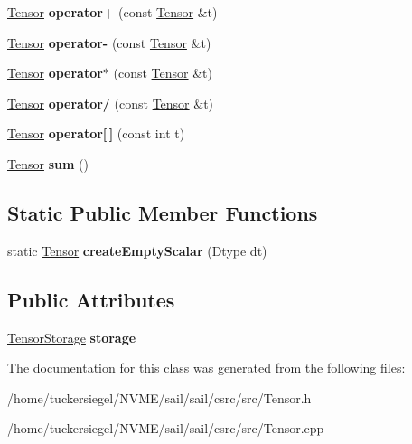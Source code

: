 \begin{DoxyCompactItemize}
\item 
\mbox{\label{classsail_1_1Tensor_af3f9e9beaa195d6a48cd523d531d8ce4}} 
\hyperlink{classsail_1_1Tensor}{Tensor} {\bfseries operator+} (const \hyperlink{classsail_1_1Tensor}{Tensor} \&t)
\item 
\mbox{\label{classsail_1_1Tensor_af832582e453597ae2d363d0936abc77a}} 
\hyperlink{classsail_1_1Tensor}{Tensor} {\bfseries operator-\/} (const \hyperlink{classsail_1_1Tensor}{Tensor} \&t)
\item 
\mbox{\label{classsail_1_1Tensor_afaa6db9a39f505b4f796349fcc17a19e}} 
\hyperlink{classsail_1_1Tensor}{Tensor} {\bfseries operator$\ast$} (const \hyperlink{classsail_1_1Tensor}{Tensor} \&t)
\item 
\mbox{\label{classsail_1_1Tensor_a937b0da33dfb53b1c111a773c0b9ef88}} 
\hyperlink{classsail_1_1Tensor}{Tensor} {\bfseries operator/} (const \hyperlink{classsail_1_1Tensor}{Tensor} \&t)
\item 
\mbox{\label{classsail_1_1Tensor_ae9bbb41d1a9f6c1c0a2241301059effd}} 
\hyperlink{classsail_1_1Tensor}{Tensor} {\bfseries operator\mbox{[}$\,$\mbox{]}} (const int t)
\item 
\mbox{\label{classsail_1_1Tensor_a237adf4c39950d5a56b3a7b608cadfb6}} 
\hyperlink{classsail_1_1Tensor}{Tensor} {\bfseries sum} ()
\end{DoxyCompactItemize}
\subsection*{Static Public Member Functions}
\begin{DoxyCompactItemize}
\item 
\mbox{\label{classsail_1_1Tensor_a9a798c58a36c12db832739235f330b9d}} 
static \hyperlink{classsail_1_1Tensor}{Tensor} {\bfseries create\+Empty\+Scalar} (Dtype dt)
\end{DoxyCompactItemize}
\subsection*{Public Attributes}
\begin{DoxyCompactItemize}
\item 
\mbox{\label{classsail_1_1Tensor_a998b6320f8aa40363d242b2bcd83be7b}} 
\hyperlink{classTensorStorage}{Tensor\+Storage} {\bfseries storage}
\end{DoxyCompactItemize}


The documentation for this class was generated from the following files\+:\begin{DoxyCompactItemize}
\item 
/home/tuckersiegel/\+N\+V\+M\+E/sail/sail/csrc/src/Tensor.\+h\item 
/home/tuckersiegel/\+N\+V\+M\+E/sail/sail/csrc/src/Tensor.\+cpp\end{DoxyCompactItemize}
